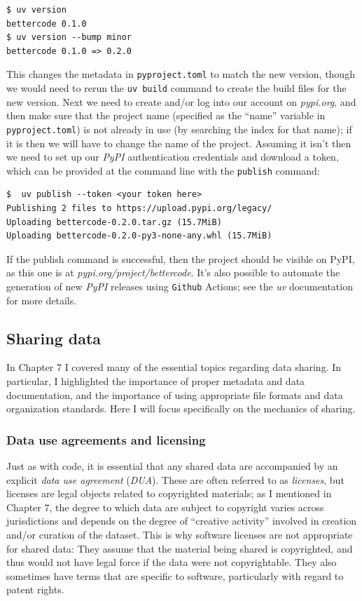 \begin{lstlisting}[style=shell]
$ uv version
bettercode 0.1.0
$ uv version --bump minor
bettercode 0.1.0 => 0.2.0
\end{lstlisting}

This changes the metadata in \texttt{pyproject.toml} to match the new version, though we would need to rerun the \texttt{uv build} command to create the build files for the new version.  Next we need to create and/or log into our account on \textit{pypi.org}, and then make sure that the project name (specified as the ``name'' variable in \texttt{pyproject.toml}) is not already in use (by searching the index for that name); if it is then we will have to change the name of the project. Assuming it isn't then we need to set up our \textit{PyPI} authentication credentials and download a token, which can be provided at the command line with the \texttt{publish} command:

\begin{lstlisting}[style=shell, numbers=none]
$  uv publish --token <your token here>
Publishing 2 files to https://upload.pypi.org/legacy/
Uploading bettercode-0.2.0.tar.gz (15.7MiB)
Uploading bettercode-0.2.0-py3-none-any.whl (15.7MiB)
\end{lstlisting}

If the publish command is successful, then the project should be visible on PyPI, as this one is at \textit{pypi.org/project/bettercode}.  It's also possible to automate the generation of new \textit{PyPI} releases using \texttt{Github} Actions; see the \textit{uv} documentation for more details.

\subsection{Sharing data}

In Chapter 7 I covered many of the essential topics regarding data sharing. In particular, I highlighted the importance of proper metadata and data documentation, and the importance of using appropriate file formats and data organization standards. Here I will focus specifically on the mechanics of sharing.

\subsubsection{Data use agreements and licensing}

Just as with code, it is essential that any shared data are accompanied by an explicit \textit{data use agreement} (\textit{DUA}).  These are often referred to as \textit{licenses}, but licenses are legal objects related to copyrighted materials; as I mentioned in Chapter 7, the degree to which data are subject to copyright varies across jurisdictions and depends on the degree of ``creative activity'' involved in creation and/or curation of the dataset. This is why software licenses are not appropriate for shared data: They assume that the material being shared is copyrighted, and thus would not have legal force if the data were not copyrightable.  They also sometimes have terms that are specific to software, particularly with regard to patent rights.

